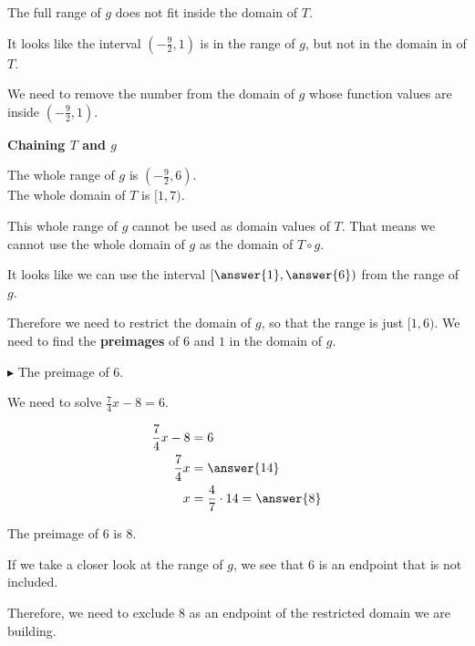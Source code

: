\documentclass{ximera}
\begin{document}
The full range of $g$ does not fit inside the domain of $T$.

It looks like the interval $\left( -\frac{9}{2}, 1 \right)$ is in the range of $g$, but not in the domain in of $T$.

We need to remove the number from the domain of $g$ whose function values are inside $\left( -\frac{9}{2}, 1 \right)$.











\begin{explanation} \textbf{\textcolor{red!75!green}{Chaining $T$ and $g$}} 


The whole range of $g$ is $\left( -\frac{9}{2}, 6 \right)$. \\
The whole domain of $T$ is $[1,7)$.


This whole range of $g$ cannot be used as domain values of $T$.  That means we cannot use the whole domain of $g$ as the domain of $T \circ g$.

It looks like we can use the interval $\left[ \answer{1}, \answer{6} \right)$ from the range of $g$.   


Therefore we need to restrict the domain of $g$, so that the range is just $[1, 6)$. We need to find the \textbf{preimages} of $6$ and $1$ in the domain of $g$.



$\blacktriangleright$ The preimage of $6$.


We need to solve $\frac{7}{4}x-8 = 6$.




\begin{align*}
\frac{7}{4}x-8 &=   6 \\
\frac{7}{4}x   &=   \answer{14} \\
x              &=   \frac{4}{7} \cdot 14 = \answer{8}
\end{align*}





The preimage of $6$ is $8$.  

If we take a closer look at the range of $g$, we see that $6$ is an endpoint that is not included.

Therefore, we need to exclude $8$ as an endpoint of the restricted domain we are building.






\end{explanation}
\end{document}
